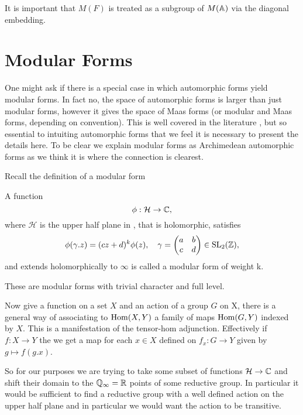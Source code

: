 \begin{remark}
    It is important that \(M(F)\) is treated as a subgroup of \(M(\A)\) via the diagonal embedding.
\end{remark}
	
    

\section{Modular Forms}
One might ask if there is a special case in which automorphic forms yield modular forms. In fact no, the space of automorphic forms is larger than just modular forms, however it gives the space of Maas forms (or modular and Maas forms, depending on convention). This is well covered in the literature \cite{emertonCLASSICALMODULARFORMS}\cite[3.2]{bumpAutomorphicFormsRepresentations1997}\cite{booherVIEWINGMODULARFORMS}\cite{garrettTransitionEisensteinSeries2016}, but so essential to intuiting automorphic forms that we feel it is necessary to present the details here. To be clear we explain modular forms as Archimedean automorphic forms as we think it is where the connection is clearest. 

	Recall the definition of a modular form 
	\begin{Definition}
		A function
		\[\phi: \mathcal{H} \to \C,\]
		where \(\mathcal{H}\) is the upper half plane in \C, that is holomorphic, satisfies 
		\[\phi(\gamma.z) = (cz+d)^k\phi(z), \quad \gamma = \begin{pmatrix}
			a &b \\
			c &d
		\end{pmatrix}\in \SL_2(\Z),\]
		and extends holomorphically to \(\infty\) is called a modular form of weight k.
	\end{Definition}
	These are modular forms with trivial character and full level.

	Now give a function on a set \(X\) and an action of a group \(G\) on X, there is a general way of associating to \(\operatorname{Hom}(X, Y)\) a family of maps \(\operatorname{Hom}(G, Y)\) indexed by \(X\). This is a manifestation of the tensor-hom adjunction. Effectively if \(f: X\to Y\) the we get a map for each \(x\in X\) defined on \(f_x : G \to Y\) given by \(g\mapsto f(g.x)\).

	So for our purposes we are trying to take some subset of functions \(\mathcal{H} \to \C\) and shift their domain to the \(\Q_\infty = \R\) points of some reductive group. In particular it would be sufficient to find a reductive group with a well defined action on the upper half plane and in particular we would want the action to be transitive.

